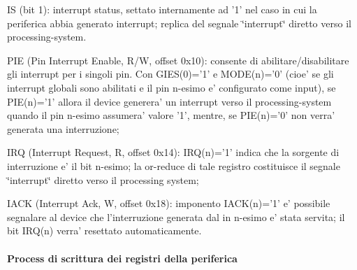 \begin{DoxyItemize}
\begin{DoxyItemize}
\item I\+S (bit 1)\+: interrupt status, settato internamente ad '1' nel caso in cui la periferica abbia generato interrupt; replica del segnale \char`\"{}interrupt\char`\"{} diretto verso il processing-\/system.
\end{DoxyItemize}
\item P\+I\+E (Pin Interrupt Enable, R/\+W, offset 0x10)\+: consente di abilitare/disabilitare gli interrupt per i singoli pin. Con G\+I\+E\+S(0)='1' e M\+O\+D\+E(n)='0' (cioe' se gli interrupt globali sono abilitati e il pin n-\/esimo e' configurato come input), se P\+I\+E(n)='1' allora il device generera' un interrupt verso il processing-\/system quando il pin n-\/esimo assumera' valore '1', mentre, se P\+I\+E(n)='0' non verra' generata una interruzione;
\item I\+R\+Q (Interrupt Request, R, offset 0x14)\+: I\+R\+Q(n)='1' indica che la sorgente di interruzione e' il bit n-\/esimo; la or-\/reduce di tale registro costituisce il segnale \char`\"{}interrupt\char`\"{} diretto verso il processing system;
\item I\+A\+C\+K (Interrupt Ack, W, offset 0x18)\+: imponento I\+A\+C\+K(n)='1' e' possibile segnalare al device che l'interruzione generata dal in n-\/esimo e' stata servita; il bit I\+R\+Q(n) verra' resettato automaticamente.
\end{DoxyItemize}

\paragraph*{Process di scrittura dei registri della periferica}

